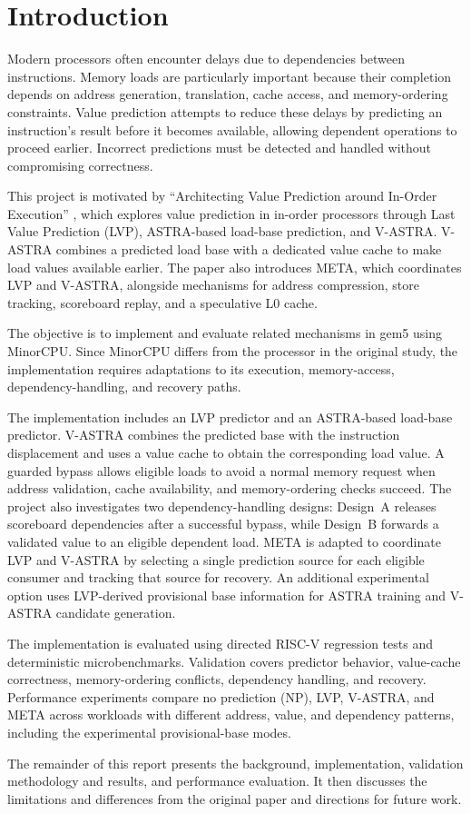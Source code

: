 \section{Introduction}

Modern processors often encounter delays due to dependencies between
instructions. Memory loads are particularly important because their
completion depends on address generation, translation, cache access,
and memory-ordering constraints. Value prediction attempts to reduce
these delays by predicting an instruction's result before it becomes
available, allowing dependent operations to proceed earlier.
Incorrect predictions must be detected and handled without
compromising correctness.

This project is motivated by
``Architecting Value Prediction around In-Order Execution''
\cite{ravenel2025architecting}, which explores value prediction in
in-order processors through Last Value Prediction (LVP), ASTRA-based
load-base prediction, and V-ASTRA. V-ASTRA combines a predicted load
base with a dedicated value cache to make load values available
earlier. The paper also introduces META, which coordinates LVP and
V-ASTRA, alongside mechanisms for address compression, store
tracking, scoreboard replay, and a speculative L0 cache.

The objective is to implement and evaluate related mechanisms in
gem5 using MinorCPU. Since MinorCPU differs from the processor in
the original study, the implementation requires adaptations to its
execution, memory-access, dependency-handling, and recovery paths.

The implementation includes an LVP predictor and an ASTRA-based
load-base predictor. V-ASTRA combines the predicted base with the
instruction displacement and uses a value cache to obtain the
corresponding load value. A guarded bypass allows eligible loads to
avoid a normal memory request when address validation, cache
availability, and memory-ordering checks succeed. The project also
investigates two dependency-handling designs: Design~A releases
scoreboard dependencies after a successful bypass, while Design~B
forwards a validated value to an eligible dependent load. META is
adapted to coordinate LVP and V-ASTRA by selecting a single
prediction source for each eligible consumer and tracking that
source for recovery. An additional experimental option uses
LVP-derived provisional base information for ASTRA training and
V-ASTRA candidate generation.

The implementation is evaluated using directed RISC-V regression
tests and deterministic microbenchmarks. Validation covers predictor
behavior, value-cache correctness, memory-ordering conflicts,
dependency handling, and recovery. Performance experiments compare
no prediction (NP), LVP, V-ASTRA, and META across workloads with different address,
value, and dependency patterns, including the experimental
provisional-base modes.

The remainder of this report presents the background, implementation,
validation methodology and results, and performance evaluation. It
then discusses the limitations and differences from the original
paper and directions for future work.
